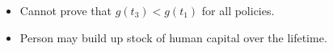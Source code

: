 \documentclass[12pt,compress,handout]{beamer}  %
\begin{document}
\begin{frame}
\begin{itemize}[<+->]
\item Cannot prove that $g(t_{3}) < g(t_{1})$ for all policies.
\\[2mm]

\item Person may build up stock of human capital over the lifetime.
\end{itemize}
\end{frame}
\end{document}
